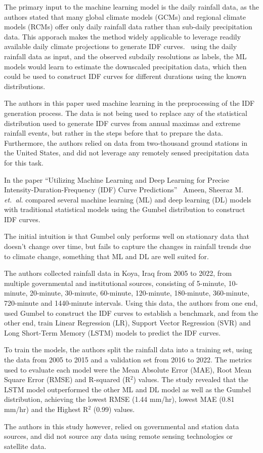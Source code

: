 The primary input to the machine learning model is the daily rainfall data, as the authors stated that many global climate models (GCMs) and regional climate models (RCMs) offer only daily rainfall data rather than sub-daily precipitation data. This apporach makes the method widely applicable to leverage readily available daily climate projections to generate IDF curves.~\cite{geosciences9050209} using the daily rainfall data as input, and the observed subdaily resolutions as labels, the ML models would learn to estimate the downscaled precipitation data, which then could be used to construct IDF curves for different durations using the known distributions.

The authors in this paper used machine learning in the preprocessing of the IDF generation process. The data is not being used to replace any of the statistical distribution used to generate IDF curves from  annual maximas and extreme rainfall events, but rather in the steps before that to prepare the data. Furthermore, the authors relied on data from two-thousand ground stations in the United States, and did not leverage any remotely sensed precipitation data for this task.

\vspace{1em}

In the paper ``Utilizing Machine Learning and Deep Learning for Precise Intensity-Duration-Frequency (IDF) Curve Predictions''~\cite{idfkoya} Ameen, Sheeraz M. \emph{et.~al.} compared several machine learning (ML) and deep learning (DL) models with traditional statistical models using the Gumbel distribution to construct IDF curves.

The initial intuition is that Gumbel only performs well on stationary data that doesn't change over time, but fails to capture the changes in rainfall trends due to climate change, something that ML and DL are well suited for.~\cite{idfkoya}

The authors collected rainfall data in Koya, Iraq from 2005 to 2022, from multiple governmental and institutional sources, consisting of 5-minute, 10-minute, 20-minute, 30-minute, 60-minute, 120-minute, 180-minute, 360-minute, 720-minute and 1440-minute intervals. Using this data, the authors from one end, used Gumbel to construct the IDF curves to establish a benchmark, and from the other end, train Linear Regression (LR), Support Vector Regression (SVR) and Long Short-Term Memory (LSTM) models to predict the IDF curves.~\cite{idfkoya}

To train the models, the authors split the rainfall data into a training set, using the data from 2005 to 2015 and a validation set from 2016 to 2022. The metrics used to evaluate each model were the Mean Absolute Error (MAE), Root Mean Square Error (RMSE) and R-squared (R$^{2}$) values. The study revealed that the LSTM model outperformed the other ML and DL model as well as the Gumbel distribution, achieving the lowest RMSE (1.44 mm/hr), lowest MAE (0.81 mm/hr) and the Highest R$^{2}$ (0.99) values.~\cite{idfkoya}

The authors in this study however, relied on governmental and station data sources, and did not source any data using remote sensing technologies or satellite data.

\vspace{1em}

